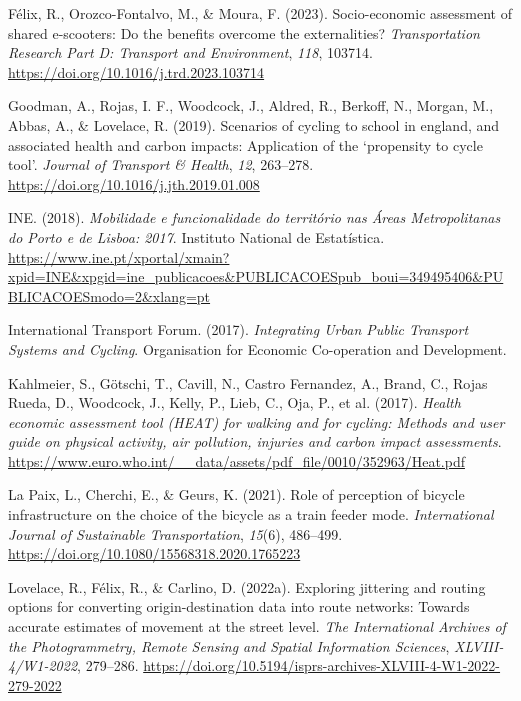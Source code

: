 \documentclass[review, doubleblind, 3p,
authoryear]{elsarticle} %
\newlength{\cslhangindent}
\newlength{\cslentryspacingunit} %
\newenvironment{CSLReferences}[2] %
 {%
  \setlength{\parindent}{0pt}
  \ifodd #1
  \let\oldpar\par
  \def\par{\hangindent=\cslhangindent\oldpar}
  \fi
  \setlength{\parskip}{#2\cslentryspacingunit}
 }%
 {}
\begin{document}
\begin{CSLReferences}{1}{0}
\leavevmode{}%
Félix, R., Orozco-Fontalvo, M., \& Moura, F. (2023). Socio-economic
assessment of shared e-scooters: Do the benefits overcome the
externalities? \emph{Transportation Research Part D: Transport and
Environment}, \emph{118}, 103714.
\url{https://doi.org/10.1016/j.trd.2023.103714}

\leavevmode{}%
Goodman, A., Rojas, I. F., Woodcock, J., Aldred, R., Berkoff, N.,
Morgan, M., Abbas, A., \& Lovelace, R. (2019). Scenarios of cycling to
school in england, and associated health and carbon impacts: Application
of the {`}propensity to cycle tool{'}. \emph{Journal of Transport \&
Health}, \emph{12}, 263--278.
\url{https://doi.org/10.1016/j.jth.2019.01.008}

\leavevmode{}%
INE. (2018). \emph{Mobilidade e funcionalidade do território nas {Áreas
Metropolitanas do Porto e de Lisboa}: 2017}. {Instituto National de
Estatística}.
\url{https://www.ine.pt/xportal/xmain?xpid=INE\&xpgid=ine_publicacoes\&PUBLICACOESpub_boui=349495406\&PUBLICACOESmodo=2\&xlang=pt}

\leavevmode{}%
International Transport Forum. (2017). \emph{Integrating {Urban Public
Transport Systems} and {Cycling}}. {Organisation for Economic
Co-operation and Development}.

\leavevmode{}%
Kahlmeier, S., Götschi, T., Cavill, N., Castro Fernandez, A., Brand, C.,
Rojas Rueda, D., Woodcock, J., Kelly, P., Lieb, C., Oja, P., et al.
(2017). \emph{Health economic assessment tool ({HEAT}) for walking and
for cycling: Methods and user guide on physical activity, air pollution,
injuries and carbon impact assessments}.
\url{https://www.euro.who.int/__data/assets/pdf_file/0010/352963/Heat.pdf}

\leavevmode{}%
La Paix, L., Cherchi, E., \& Geurs, K. (2021). Role of perception of
bicycle infrastructure on the choice of the bicycle as a train feeder
mode. \emph{International Journal of Sustainable Transportation},
\emph{15}(6), 486--499.
\url{https://doi.org/10.1080/15568318.2020.1765223}

\leavevmode{}%
Lovelace, R., Félix, R., \& Carlino, D. (2022a). Exploring jittering and
routing options for converting origin-destination data into route
networks: Towards accurate estimates of movement at the street level.
\emph{The International Archives of the Photogrammetry, Remote Sensing
and Spatial Information Sciences}, \emph{XLVIII-4/W1-2022}, 279--286.
\url{https://doi.org/10.5194/isprs-archives-XLVIII-4-W1-2022-279-2022}


\end{CSLReferences}
\end{document}
